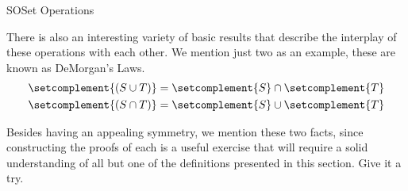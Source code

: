 \begin{subsect}{SO}{Set Operations}
%
\begin{para}There is also an interesting variety of basic results that describe the interplay of these operations with each other.  We mention just two as an example, these are known as DeMorgan's Laws.
%
\begin{align*}
\setcomplement{\left(S\cup T\right)}&=\setcomplement{S}\cap\setcomplement{T}\\
\setcomplement{\left(S\cap T\right)}&=\setcomplement{S}\cup\setcomplement{T}\\
\end{align*}
\end{para}
%
\begin{para}Besides having an appealing symmetry, we mention these two facts, since constructing the proofs of each is a useful exercise that will require a solid understanding of all but one of the definitions presented in this section.  Give it a try.\end{para}
%
\end{subsect}
%
